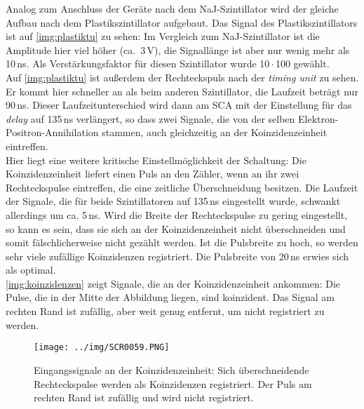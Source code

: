 Analog zum Anschluss der Geräte nach dem NaJ-Szintillator wird der gleiche Aufbau nach dem Plastikszintillator
aufgebaut. Das Signal des Plastikszintillators ist auf \autoref{img:plastiktu} zu sehen:
Im Vergleich zum NaJ-Szintillator ist die Amplitude hier viel höher (ca.~3\,V),
die Signallänge ist aber nur wenig mehr als 10\,ns.
Als Verstärkungsfaktor für diesen Szintillator wurde 10\,$\cdot$\,100 gewählt.\\
Auf \autoref{img:plastiktu} ist außerdem der Rechteckspuls nach der \emph{timing unit} zu sehen.
Er kommt hier schneller an als beim anderen Szintillator, 
die Laufzeit beträgt nur 90\,ns. Dieser Laufzeitunterschied wird dann am SCA mit der
Einstellung für das \emph{delay} auf 135\,ns verlängert, so dass zwei Signale, die von der selben
Elektron-Positron-Annihilation stammen, auch gleichzeitig an der Koinzidenzeinheit eintreffen.\\
Hier liegt eine weitere kritische Einstellmöglichkeit der Schaltung:
Die Koinzidenzeinheit liefert einen Puls an den Zähler, wenn an ihr zwei Rechteckspulse eintreffen,
die eine zeitliche Überschneidung besitzen.
Die Laufzeit der Signale, die für beide Szintillatoren auf 135\,ns eingestellt wurde,
schwankt allerdings um ca. 5\,ns. Wird die Breite der Rechteckspulse zu gering eingestellt, so
kann es sein, dass sie sich an der Koinzidenzeinheit nicht überschneiden und somit fälschlicherweise nicht
gezählt werden. Ist die Pulsbreite zu hoch, so werden sehr viele zufällige Koinzidenzen registriert.
Die Pulsbreite von 20\,ns erwies sich als optimal.\\
\autoref{img:koinzidenzen} zeigt Signale, die an der Koinzidenzeinheit ankommen:
Die Pulse, die in der Mitte der Abbildung liegen, sind koinzident.
Das Signal am rechten Rand ist zufällig, aber weit genug entfernt, um nicht registriert zu werden.

\begin{figure}[H]
\begin{center}
  \texttt{[image: ../img/SCR0059.PNG]}
  \caption[---]{Eingangssignale an der Koinzidenzeinheit: Sich überschneidende Rechteckspulse werden als
  Koinzidenzen registriert. Der Puls am rechten Rand ist zufällig und wird nicht registriert.}
  \label{img:koinzidenzen}
\end{center}
\end{figure}